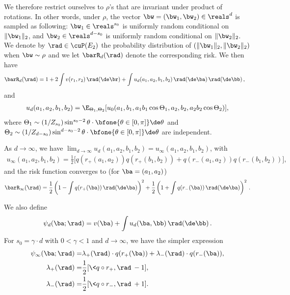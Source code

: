 \documentclass[11pt]{article}
\begin{document}
We therefore restrict ourselves to $\rho$'s that are invariant under product of rotations.
In other words, under $\rho$, the vector $\bw = (\bw_1, \bw_2) \in \reals^d$ is sampled as following: $\bw_1 \in \reals^{s_0}$ is uniformly random conditional on $\|\bw_1\|_2$, and $\bw_2 \in \reals^{d - s_0}$ is uniformly random conditional on $\| \bw_2 \|_2$. We denote by $\rad \in \cuP(E_2)$ the probability distribution of $(\|\bw_1\|_2, \| \bw_2 \|_2)$ when $\bw\sim\rho$ and we let $\barR_d(\rad)$ denote the corresponding risk. We then have
%
\begin{align}
%
\barR_d(\rad) &= 1+2 \int v(r_1, r_2) \, \rad(\de \br) + \int u_d(a_1, a_2, b_1, b_2) \, \rad(\de \ba)\,\rad(\de \bb)\,,
\end{align}
and
\begin{align}\label{eqn:u_d_anisotropic}
 u_d(a_1, a_2, b_1, b_2) = \E_{\Theta_1,\Theta_2}[u_0(a_1, b_1, a_1 b_1 \cos\Theta_1, a_2, b_2, a_2 b_2 \cos\Theta_2 )], 
\end{align}
where $\Theta_1 \sim (1/Z_{s_0}) \sin^{s_0 -2} \theta \cdot \bfone\{ \theta \in [0, \pi] \} \de \theta$ and $\Theta_2 \sim (1/Z_{d - s_0}) \sin^{d - s_0 - 2} \theta \cdot \bfone\{ \theta \in [0, \pi] \} \de \theta$ are independent.


As $d\to\infty$, we have $\lim_{d\to\infty}u_d(a_1, a_2, b_1, b_2) = u_{\infty}(a_1, a_2, b_1, b_2)$, with
\begin{align}\label{eqn:u_infty_anisotropic}
u_{\infty}(a_1, a_2, b_1, b_2) =\frac{1}{2 }\Big[q(r_+(a_1, a_2)) q(r_+(b_1, b_2))+ q(r_-(a_1, a_2)) q(r_-(b_1, b_2))\Big],
\end{align}
and the risk function converges to (for $\ba = (a_1, a_2)$)
%
\begin{align}\label{eqn:Risk_infinite_anisotropic}
%
\barR_{\infty}(\rad)= \frac{1}{2}\left(1-\int q(r_+(\ba))\, \rad(\de \ba)\right)^2+\frac{1}{2}\left(1 + \int q(r_-(\ba))\, \rad(\de \ba)\right)^2\,.
%
\end{align}


We also define
%
\begin{align}
%
\psi_d(\ba;\rad) = v(\ba) +\int u_d(\ba, \bb) \, \rad(\de \bb)\, .
%
\end{align}
%
For $s_0 = \gamma \cdot d$ with $0 < \gamma < 1$ and $d \to \infty$, we have the simpler expression
\begin{align}
\psi_\infty(\ba; \rad) =& \lambda_+(\rad) \cdot q(r_+(\ba)) + \lambda_-(\rad) \cdot q(r_-(\ba)), \label{eqn:psi_in_anisotropic_proof}\\
\lambda_+(\rad) =& \frac{1}{2} [ \< q \circ r_+, \rad\> - 1 ], \label{eq:LambdaPlusAnisotropic}\\
\lambda_-(\rad) =& \frac{1}{2} [ \< q \circ r_-, \rad\> + 1 ].  \label{eq:LambdaMinusAnisotropic}
\end{align}
\end{document}
